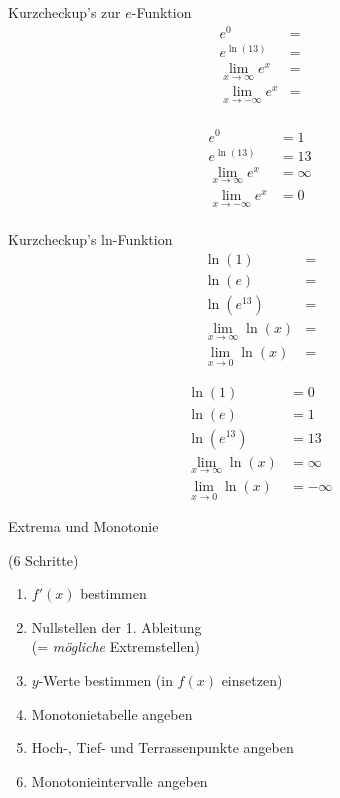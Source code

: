 \documentclass[paper=a6,ngerman,twoside=true,fontsize=14pt, parskip = half]{scrartcl}
\begin{document}
\begin{frage}
		Kurzcheckup's zur $e$-Funktion
		\begin{align*}
		e^0&= \\
		e^{\ln(13)}&= \\
		\displaystyle\lim_{x\rightarrow\infty} e^x&= \\
		\displaystyle\lim_{x\rightarrow -\infty} e^x&= \\
	\end{align*}
\end{frage}
\begin{antwort}
	\begin{align*}
		e^0&=1 \\
		e^{\ln(13)}&=13 \\
		\displaystyle\lim_{x\rightarrow\infty} e^x&=\infty \\
		\displaystyle\lim_{x\rightarrow -\infty} e^x&= 0 \\
	\end{align*}
\end{antwort}
\begin{frage}
	Kurzcheckup's ln-Funktion
	\begin{align*}
		\ln(1)&= \\
		\ln(e)&= \\
		\ln(e^{13})&= \\
		\lim_{x\rightarrow\infty }\ln(x)&= \\
		\lim_{x\rightarrow 0 }\ln(x)&= 
	\end{align*}
\end{frage}
\begin{antwort}
	\begin{align*}
		\ln(1)&= 0 \\
		\ln(e)&= 1\\
		\ln(e^{13})&= 13\\
		\lim_{x\rightarrow\infty }\ln(x)&= \infty \\
		\lim_{x\rightarrow 0 }\ln(x)&= -\infty 
	\end{align*}
\end{antwort}
\begin{frage}
	Extrema und Monotonie \bigskip 
	
	(6 Schritte)	
\end{frage}

\begin{antwort}
	\begin{enumerate}
		\item $f'(x)$ bestimmen
		\item Nullstellen der 1. Ableitung \\
			(= \emph{mögliche} Extremstellen)
		\item $y$-Werte bestimmen (in $f(x)$ einsetzen)
		\item Monotonietabelle angeben
		\item Hoch-, Tief- und Terrassenpunkte angeben
		\item Monotonieintervalle angeben						
	\end{enumerate}
\end{antwort}
\end{document}
